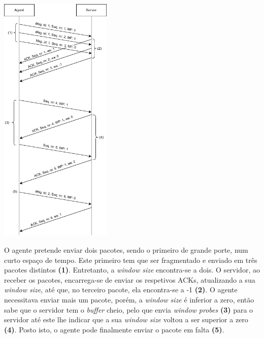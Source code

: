 \documentclass[a4paper,12pt]{scrreprt}
\begin{document}
\begin{minipage}{\textwidth}
    \centering
    \includegraphics[width=0.4\textwidth]{img/sequence_diagrams/flux_control.png}
    \label{fig:nt_flux_control}
\end{minipage}

O agente pretende enviar dois pacotes, sendo o primeiro de grande porte, num curto espaço de tempo. Este primeiro tem que ser
fragmentado e enviado em três pacotes distintos \textbf{(1)}. Entretanto, a \textit{window size} encontra-se a dois.
O servidor, ao receber os pacotes, encarrega-se de enviar os respetivos ACKs, atualizando a sua \textit{window size}, até que, no terceiro
pacote, ela encontra-se a -1 \textbf{(2)}. O agente necessitava enviar mais um pacote, porém, a \textit{window size} é inferior a zero,
então sabe que o servidor tem o \textit{buffer} cheio, pelo que envia \textit{window probes} \textbf{(3)} para o servidor
até este lhe indicar que a sua \textit{window size} voltou a ser superior a zero \textbf{(4)}. Posto isto, o agente pode finalmente enviar
o pacote em falta \textbf{(5)}.



\end{document}
